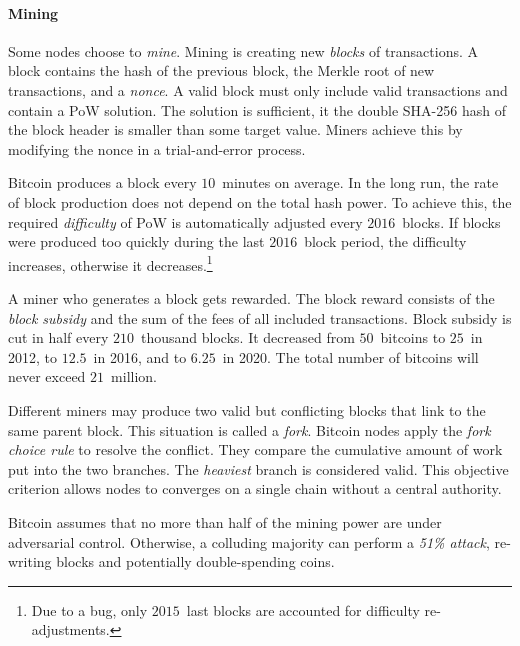 \paragraph{Mining}

Some nodes choose to \textit{mine}.
Mining is creating new \textit{blocks} of transactions.
A block contains the hash of the previous block, the Merkle root of new transactions, and a \textit{nonce}.
A valid block must only include valid transactions and contain a PoW solution.
The solution is sufficient, it the double SHA-256 hash of the block header is smaller than some target value.
Miners achieve this by modifying the nonce in a trial-and-error process.

Bitcoin produces a block every $10$~minutes on average.
In the long run, the rate of block production does not depend on the total hash power.
To achieve this, the required \textit{difficulty} of PoW is automatically adjusted every $2016$~blocks.
If blocks were produced too quickly during the last $2016$~block period, the difficulty increases, otherwise it decreases.\footnote{Due to a bug, only $2015$~last blocks are accounted for difficulty re-adjustments.}

A miner who generates a block gets rewarded.
The block reward consists of the \textit{block subsidy} and the sum of the fees of all included transactions.
Block subsidy is cut in half every $210$~thousand blocks.
It decreased from $50$~bitcoins to $25$~in 2012, to $12.5$~in 2016, and to $6.25$~in 2020.
The total number of bitcoins will never exceed $21$~million.

Different miners may produce two valid but conflicting blocks that link to the same parent block.
This situation is called a \textit{fork}.
Bitcoin nodes apply the \textit{fork choice rule} to resolve the conflict.
They compare the cumulative amount of work put into the two branches.
The \textit{heaviest} branch is considered valid.
This objective criterion allows nodes to converges on a single chain without a central authority.

Bitcoin assumes that no more than half of the mining power are under adversarial control.
Otherwise, a colluding majority can perform a \textit{51\% attack}, re-writing blocks and potentially double-spending coins.

